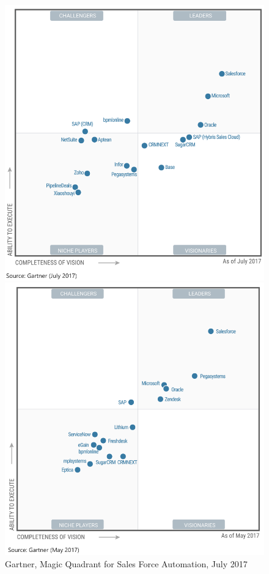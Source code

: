 \begin{figure}[!h]
    \begin{minipage}[c]{0.48\linewidth}
        \includegraphics[width=\linewidth]{images/magic_quadrant_sales_force_automation.png}
        \caption[Magic Quadrant for Sales Force Automation]{Gartner, Magic Quadrant for Sales Force Automation, July 2017}
        \label{fig:magic-quadrant-sales-force}
    \end{minipage}
    \hfill
    \begin{minipage}[c]{0.49\linewidth}
        \includegraphics[width=\linewidth]{images/magic_quadrant_customer_engagement_center.png}

\end{minipage}
\end{figure}
